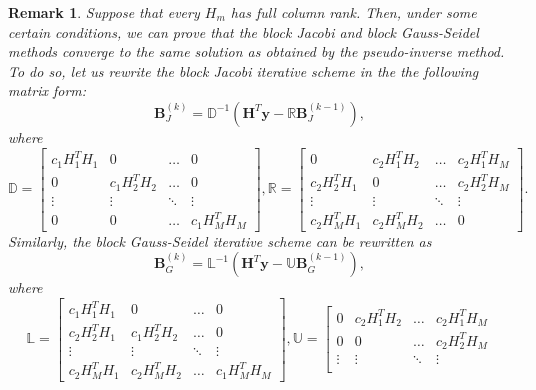 \documentclass{article}
\newtheorem{remark}{Remark}
\begin{document}
\begin{remark}
Suppose that every $H_m$ has full column rank. Then, under some certain conditions, we can prove that  the block Jacobi and block Gauss-Seidel methods  \cite{young1971Iterative} converge to the same solution as obtained by the pseudo-inverse method. To do so, let us rewrite  the block Jacobi iterative scheme in the the following matrix form:
\begin{equation}\label{Eq32_Bk_DR}
 \bm{B}_J^{(k)} = \mathbb{D}^{-1} (\bm{H}^T\bm{y} - \mathbb{R} \bm{B}_J^{(k-1)}), 
\end{equation}
where
\begin{equation}\label{Eq33_D}
\mathbb{D} = 
\left[
\begin{array}{cccc}
c_1H_1^TH_1 & 0 & \ldots & 0 \\
0 & c_1H_2^TH_2 & \ldots & 0\\
\vdots & \vdots & \ddots & \vdots \\
0 & 0 & \ldots & c_1H_M^TH_M
\end{array}
\right],
\mathbb{R} = 
\left[
\begin{array}{cccc}
0 & c_2H_1^TH_2 & \ldots & c_2H_1^TH_M \\
c_2H_2^TH_1 & 0 & \ldots & c_2H_2^TH_M \\
\vdots & \vdots & \ddots & \vdots \\
c_2H_M^TH_1 & c_2H_M^TH_2 & \ldots & 0
\end{array}
\right].
\end{equation}
Similarly,  the block Gauss-Seidel iterative scheme can be rewritten as 
\begin{equation}\label{Eq35_Bk_LU}
\bm{B}_G^{(k)} = \mathbb{L}^{-1} (\bm{H}^T\bm{y} - \mathbb{U} \bm{B}_G^{(k-1)}), 
\end{equation}
where
\begin{equation} \label{Eq36_L}
\mathbb{L} = 
\left[
\begin{array}{cccc}
c_1H_1^TH_1 & 0 & \ldots & 0 \\
c_2H_2^TH_1 & c_1H_2^TH_2 & \ldots & 0\\
\vdots & \vdots & \ddots & \vdots \\
c_2H_M^TH_1 & c_2H_M^TH_2 & \ldots & c_1H_M^TH_M
\end{array}
\right],
\mathbb{U} = 
\left[
\begin{array}{cccc}
0 & c_2H_1^TH_2 & \ldots & c_2H_1^TH_M \\
0 & 0 & \ldots & c_2H_2^TH_M \\
\vdots & \vdots & \ddots & \vdots \\

\end{array}
\end{equation}
\end{remark}
\end{document}

